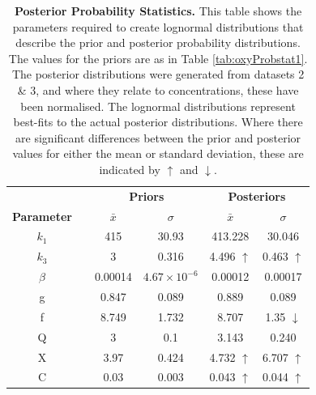 \begin{table}[tbp]%
\renewcommand{\arraystretch}{1.5}
\begin{center}
\begin{tabular}{cccccc}
\toprule
& & \multicolumn{2}{c}{\textbf{Priors}} & \multicolumn{2}{c}{\textbf{Posteriors}} \\
\textbf{Parameter} && ${\bar{x}}$ & $\sigma$ & ${\bar{x}}$ & $\sigma$\\
\midrule
$k_1$ && 415 & 30.93 & 413.228 & 30.046\\
$k_3$ && 3 & 0.316 & 4.496 $\uparrow$ & 0.463 $\uparrow$\\
$\beta$ && 0.00014 & $4.67\times 10^{-6}$ & 0.00012 & 0.00017\\
g && 0.847 & 0.089 & 0.889 & 0.089\\
f && 8.749 & 1.732 & 8.707 & 1.35 $\downarrow$\\
Q && 3 & 0.1 & 3.143 & 0.240\\
X && 3.97 & 0.424 & 4.732 $\uparrow$ & 6.707 $\uparrow$\\
C && 0.03 & 0.003 & 0.043 $\uparrow$ & 0.044 $\uparrow$\\
\bottomrule
\end{tabular}
\end{center}
\caption[Posterior Probability Statistics]{{\bf Posterior Probability Statistics.} This table shows the parameters required to create lognormal distributions that describe the prior and posterior probability distributions. The values for the priors are as in Table \ref{tab:oxyProbstat1}. The posterior distributions were generated from datasets 2 \& 3, and where they relate to concentrations, these have been normalised. The lognormal distributions represent best-fits to the actual posterior distributions. Where there are significant differences between the prior and posterior values for either the mean or standard deviation, these are indicated by $\uparrow$ and $\downarrow$.
\label{tab:oxyPstat}}
\end{table}

